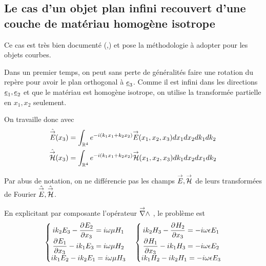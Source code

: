 \subsection{Le cas d'un objet plan infini recouvert d'une couche de matériau homogène isotrope}
Ce cas est très bien documenté (\cite{senior_approximate_1995},\cite{hoppe_impedance_1995}) et pose la méthodologie à adopter pour les objets courbes. 

Dans un premier temps, on peut sans perte de généralités faire une rotation du repère pour avoir le plan orthogonal à $\v e_3$. Comme il est infini dans les directions $\v e_1, \v e_2$ et que le matériau est homogène isotrope, on utilise la transformée partielle en $x_1, x_2$ seulement.

\renewcommand{\x}{{\v e_1}}
\renewcommand{\y}{{\v e_2}}
\renewcommand{\z}{{\v e_3}}
\renewcommand{\peps}{{\eps}}
\renewcommand{\pmu}{{\mu}}
\begin{figure}[h!]
\centering
\begin{tikzpicture}

\end{tikzpicture}
\end{figure}

On travaille donc avec 
\begin{align}
\hat{\vE} (x_3) &= \int_{\RR^4} e^{-i(k_1x_1+k_2x_2 )}\vE(x_1,x_2,x_3) dx_1dx_2dk_1dk_2\\
\hat{\vH} (x_3) &= \int_{\RR^4} e^{-i(k_1x_1+k_2x_2 )}\vH(x_1,x_2,x_3) dk_1dx_2dx_1dk_2
\end{align}

\begin{tcolorbox}
Par abus de notation, on ne différencie pas les champs $\vE,\vH$ de leurs transformées de Fourier $\hat \vE, \hat \vH$.
\end{tcolorbox}

En explicitant par composante l'opérateur $\vrot$ , le problème est 
\begin{align*}
    \left\lbrace 
    \begin{matrix}
    ik_2 E_3  - \ddr{x_3}{E_ 2} = i \w \mu H_1 \\
    \ddr{x_3}{E_1} - ik_1 E_3 = i\w \mu H_2 \\
    ik_1 E_2 - ik_2 E_1 = i\w \mu H_3 \\
    \end{matrix}
    \right. \quad 
    \left\lbrace 
    \begin{matrix}
    ik_2 H_3  - \ddr{x_3}{H_ 2} = -i \w \eps E_1 \\
    \ddr{x_3}{H_1} - ik_1 H_3 = -i\w \eps E_2 \\
    ik_1 H_2 - ik_2 H_1 = -i\w \eps E_3 \\
    \end{matrix}
    \right.
\end{align*}

